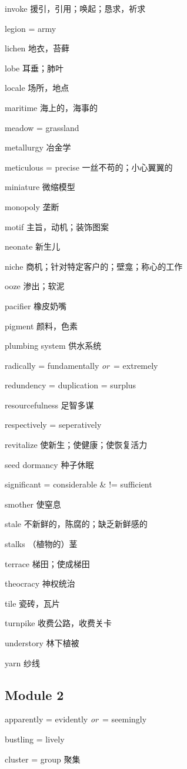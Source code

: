 \documentclass[UTF8, fontset = none, zihao = -4, linespread = 1.1]{ctexart}
\renewcommand{\o}{\textit{or}\ }
\begin{document}
\begin{multicols}{2}
invoke 援引，引用；唤起；恳求，祈求

legion = army

lichen 地衣，苔藓

lobe 耳垂；肺叶

locale 场所，地点

maritime 海上的，海事的

meadow = grassland

metallurgy 冶金学

meticulous = precise 一丝不苟的；小心翼翼的

miniature 微缩模型

monopoly 垄断

motif 主旨，动机；装饰图案

neonate 新生儿

niche 商机；针对特定客户的；壁龛；称心的工作

ooze 渗出；软泥

pacifier 橡皮奶嘴

pigment 颜料，色素

plumbing system 供水系统

radically = fundamentally \o = extremely

redundency = duplication = surplus

resourcefulness 足智多谋

respectively = seperatively

revitalize 使新生；使健康；使恢复活力

seed dormancy 种子休眠

significant = considerable \& != sufficient

smother 使窒息

stale 不新鲜的，陈腐的；缺乏新鲜感的

stalks （植物的）茎

terrace 梯田；使成梯田

theocracy 神权统治

tile 瓷砖，瓦片

turnpike 收费公路，收费关卡

understory 林下植被

yarn 纱线

\subsection{Module 2}
apparently = evidently \o = seemingly

bustling = lively

cluster = group 聚集


\end{multicols}
\end{document}
